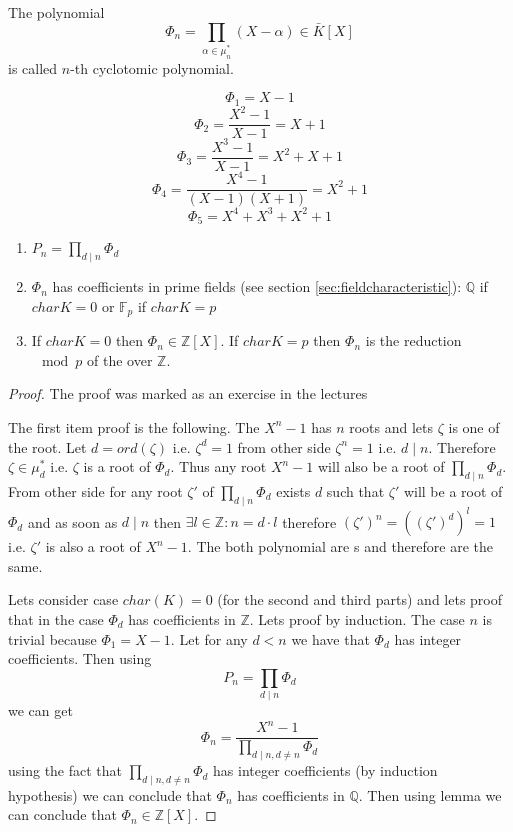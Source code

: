 \begin{definition}
  The polynomial
  \[
  \Phi_n = \prod_{\alpha \in \mu_n^*}\left(X - \alpha\right) \in \bar{K}\left[X\right]
  \]
  is called $n$-th cyclotomic polynomial.
  \label{def:cyclotomicpolynomial}
\end{definition}

\begin{example}
  \[
  \Phi_1 = X - 1
  \]
  \[
  \Phi_2 = \frac{X^2 - 1}{X-1} = X + 1
  \]
  \[
  \Phi_3 = \frac{X^3 - 1}{X-1} = X^2 + X + 1
  \]
  \[
  \Phi_4 = \frac{X^4 - 1}{\left(X-1\right)\left(X + 1\right)} = X^2 + 1
  \]
  \[
  \Phi_5 = X^4 + X^3 + X^2 + 1
  \]  
\end{example}

\begin{proposition}
  \begin{enumerate}
    \item 
      \(
      P_n = \prod_{d \mid n} \Phi_d
      \)
    \item $\Phi_n$ has coefficients in prime fields (see section
      \ref{sec:fieldcharacteristic}): $\mathbb{Q}$ if $char K = 0$ or
      $\mathbb{F}_p$ if $char K = p$
    \item If $char K = 0$ then $\Phi_n \in
      \mathbb{Z}\left[X\right]$. If $char K = p$ then $\Phi_n$ is the
      reduction $\mod{p}$ of the 
      over $\mathbb{Z}$.
  \end{enumerate}
  \begin{proof}
    The proof was marked as an exercise in the lectures
    
    The first item proof is the following. The $X^n - 1$ has $n$ roots and
    lets $\zeta$ is one of the 
    root. Let $d=ord\left(\zeta\right)$ i.e. $\zeta^d = 1$ from other side
    $\zeta^n = 1$ i.e. $d \mid n$. Therefore $\zeta \in \mu_d^\ast$
    i.e. $\zeta$ is a root of $\Phi_d$. Thus any root $X^n - 1$ will
    also be a root of $\prod_{d \mid n} \Phi_d$.
    From other side for any root $\zeta'$ of $\prod_{d \mid n}
    \Phi_d$ exists $d$ such that $\zeta'$ will be a root of $\Phi_d$
    and as soon as $d \mid n$ then $\exists l \in \mathbb{Z}: n = d
    \cdot l$ therefore $\left(\zeta'\right)^n =
    \left(\left(\zeta'\right)^d\right)^l = 1$ i.e. $\zeta'$ is also
    a root of $X^n - 1$. The both polynomial
    are s and therefore are the same.
    
    Lets consider case
    $char(K) = 0$ (for the second and third parts) and lets proof that
    in the case $\Phi_d$ has coefficients in 
    $\mathbb{Z}$. Lets proof by induction. The case $n$ is trivial
    because 
    $\Phi_1 = X - 1$. Let for any $d < n$ we have that $\Phi_d$ has
    integer coefficients. Then using
    \[
    P_n = \prod_{d \mid n} \Phi_d
    \]
    we can get
    \[
    \Phi_n = \frac{X^n-1}{\prod_{d \mid n, d \ne n} \Phi_d}
    \]
    using the fact that $\prod_{d \mid n, d \ne n} \Phi_d$ has integer
    coefficients (by induction hypothesis) we can conclude that
    $\Phi_n$ has coefficients in $\mathbb{Q}$. Then using
     lemma we can conclude that $\Phi_n \in
    \mathbb{Z}\left[X\right]$.


\end{proof}
\end{proposition}
